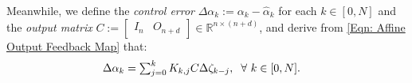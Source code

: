 \documentclass[letterpaper, 10 pt, conference]{ieeeconf}
\newcommand{\K}{\mathcal{K}}
\newcommand{\R}{\mathbb{R}}
\newcommand{\?}{\stackrel{?}{=}}
\newcommand{\param}{\theta}
\newcommand{\paramDim}{d}
\newcommand{\var}{\xi}
\newcommand{\varDim}{n}
\newcommand{\ratePGDNominal}{\hat\ratePGD}
\newcommand{\varError}{\Delta\var}
\newcommand{\paramError}{\Delta\param}
\newcommand{\ratePGDError}{\Delta\ratePGD}
\newcommand{\disturbance}{d}
\newcommand{\ratePGD}{\alpha}
\newcommand{\feedbackGain}{K}
\newcommand{\feedbackGainStacked}{\K}
\newcommand{\systemResponse}{\Phi}
\newcommand{\jacobianControl}{B}
\newcommand{\iterationHorizon}{N}
\newcommand{\state}{\zeta}
\newcommand{\stateNominal}{\hat\state}
\newcommand{\stateError}{\Delta\state}
\newcommand{\outputMatrix}{C}
\newcommand{\frank}[1]{{\textcolor[rgb]{0,0,1}{\textsf{[Frank: {#1}]}}}}
\newcommand{\antoine}[1]{{\textcolor[rgb]{1,0,0}{\textsf{[Antoine: {#1}]}}}}
\begin{document}
\hspace{-1.5mm}Meanwhile, we define the \textit{control error} $\ratePGDError_k := \ratePGD_k - \ratePGDNominal_k$ for each $k \in [0, \iterationHorizon]$ and the \textit{output matrix} $\outputMatrix := \begin{bmatrix}
    I_\varDim & O_{\varDim + \paramDim}
\end{bmatrix} \in \R^{\varDim \times (\varDim + \paramDim)}$, and derive from \eqref{Eqn: Affine Output Feedback Map} that:
{
\setlength{\abovedisplayskip}{3.5pt}
\setlength{\belowdisplayskip}{3.5pt}
\begin{align}
    \label{Eqn: Control Error as affine function of State Errors}
    \ratePGDError_k 
    &= \textstyle\sum_{j=0}^k \feedbackGain_{k,j} \outputMatrix \stateError_{k-j},
    \hspace{2mm} \forall \ k \in [0, \iterationHorizon].
\end{align}
}


\end{document}
